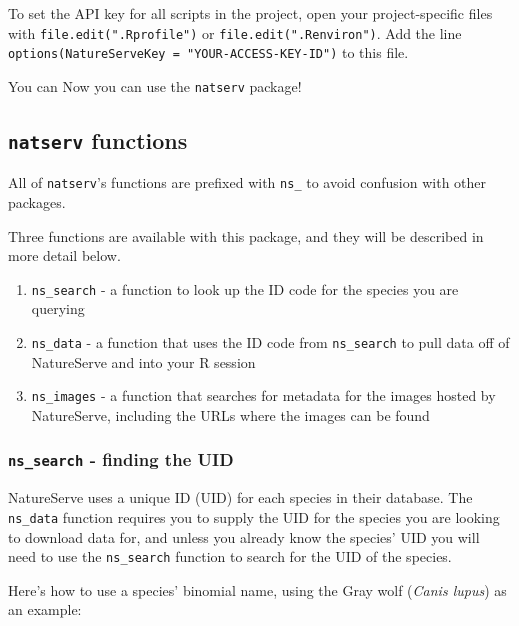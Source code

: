 \documentclass[]{article}
\providecommand{\tightlist}{%
  \setlength{\itemsep}{0pt}\setlength{\parskip}{0pt}}
\begin{document}
To set the API key for all scripts in the project, open your
project-specific files with \texttt{file.edit(".Rprofile")} or
\texttt{file.edit(".Renviron")}. Add the line
\texttt{options(NatureServeKey\ =\ "YOUR-ACCESS-KEY-ID")} to this file.

You can Now you can use the \texttt{natserv} package!

\hypertarget{natserv-functions}{%
\subsection{\texorpdfstring{\texttt{natserv}
functions}{natserv functions}}\label{natserv-functions}}

All of \texttt{natserv}'s functions are prefixed with \texttt{ns\_} to
avoid confusion with other packages.

Three functions are available with this package, and they will be
described in more detail below.

\begin{enumerate}
\def\labelenumi{\arabic{enumi}.}
\tightlist
\item
  \texttt{ns\_search} - a function to look up the ID code for the
  species you are querying
\item
  \texttt{ns\_data} - a function that uses the ID code from
  \texttt{ns\_search} to pull data off of NatureServe and into your R
  session
\item
  \texttt{ns\_images} - a function that searches for metadata for the
  images hosted by NatureServe, including the URLs where the images can
  be found
\end{enumerate}

\hypertarget{ns_search---finding-the-uid}{%
\subsubsection{\texorpdfstring{\texttt{ns\_search} - finding the
UID}{ns\_search - finding the UID}}\label{ns_search---finding-the-uid}}

NatureServe uses a unique ID (UID) for each species in their database.
The \texttt{ns\_data} function requires you to supply the UID for the
species you are looking to download data for, and unless you already
know the species' UID you will need to use the \texttt{ns\_search}
function to search for the UID of the species.

Here's how to use a species' binomial name, using the Gray wolf
(\emph{Canis lupus}) as an example:
\end{document}
